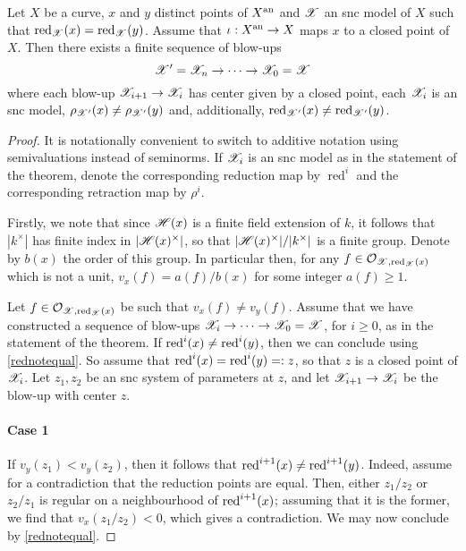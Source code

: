 \begin{lemma}\label{injectivityforzariskiclosed}
    Let $X$ be a curve, $x$ and $y$ distinct points of $X^{\text{an}}$ and $\mathscr{X}$ an snc model of $X$ such that $\operatorname{red}_{\mathscr{X}}(x) = \operatorname{red}_{\mathscr{X}}(y)$.
    Assume that $\iota: X^{\text{an}} \to X$ maps $x$ to a closed point of $X$.
    Then there exists a finite sequence of blow-ups
    \[
        \mathscr{X}' = \mathscr{X}_n \to \dots \to \mathscr{X}_0 = \mathscr{X}
    \]
    where each blow-up $\mathscr{X}_{i + 1} \to \mathscr{X}_i$ has center given by a closed point, each $\mathscr{X}_i$ is an snc model, $\rho_{\mathscr{X}'}(x) \neq \rho_{\mathscr{X}'}(y)$ and, additionally, $\operatorname{red}_{\mathscr{X}'}(x) \neq \operatorname{red}_{\mathscr{X}'}(y)$.
\end{lemma}
\begin{proof}
    It is notationally convenient to switch to additive notation using semivaluations instead of seminorms. If $\mathscr{X}_i$ is an snc model as in the statement of the theorem, denote the corresponding reduction map by $\operatorname{red}^{i}$ and the corresponding retraction map by $\rho^{i}$.
    
    Firstly, we note that since $\mathscr{H}(x)$ is a finite field extension of $k$, it follows that $|k^{\times}|$ has finite index in $|\mathscr{H}(x)^\times|$, so that $|\mathscr{H}(x)^{\times}|/|k^{\times}|$ is a finite group.
    Denote by $b(x)$ the order of this group.
    In particular then, for any $f \in \mathcal{O}_{\mathscr{X}, \operatorname{red}_{\mathscr{X}}(x)}$ which is not a unit, $v_x(f) = a(f)/b(x)$ for some integer $a(f) \geq 1$.
    
    Let $f \in \mathcal{O}_{\mathscr{X}, \operatorname{red}_{\mathscr{X}}(x)}$ be such that $v_x(f) \neq v_y(f)$.
    Assume that we have constructed a sequence of blow-ups $\mathscr{X}_{i} \to \dots \to \mathscr{X}_{0} = \mathscr{X}$, for $i \geq 0$, as in the statement of the theorem.
    If $\operatorname{red}^{i}(x) \neq \operatorname{red}^{i}(y)$, then we can conclude using \cref{rednotequal}.
    So assume that $\operatorname{red}^{i}(x) = \operatorname{red}^{i}(y) =: z$, so that $z$ is a closed point of $\mathscr{X}_i$.
    Let $z_1, z_2$ be an snc system of parameters at $z$, and let $\mathscr{X}_{i + 1} \to \mathscr{X}_{i}$ be the blow-up with center $z$.
    
    \paragraph{Case 1}
    If $v_y(z_1) < v_y(z_2)$, then it follows that $\operatorname{red}^{i + 1}(x) \neq \operatorname{red}^{i + 1}(y)$.
    Indeed, assume for a contradiction that the reduction points are equal.
    Then, either $z_1/z_2$ or $z_2/z_1$ is regular on a neighbourhood of $\operatorname{red}^{i + 1}(x)$; assuming that it is the former, we find that $v_x(z_1/z_2) < 0$, which gives a contradiction.
    We may now conclude by \cref{rednotequal}.
    

\end{proof}

